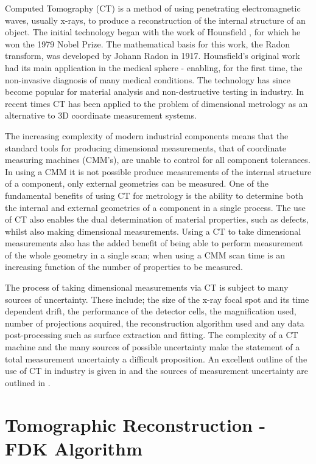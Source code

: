 \documentclass[
  twoside,
  11pt, a4paper,
  footinclude=true,
  headinclude=true,
  cleardoublepage=empty
]{scrbook}
\begin{document}
Computed Tomography (CT) is a method of using penetrating electromagnetic waves, usually x-rays, to produce a reconstruction of the internal structure of an object. The initial technology began with the work of Hounsfield \cite{hounsfield1973computerized}, for which he won the 1979 Nobel Prize. The mathematical basis for this work, the Radon transform, was developed by Johann Radon \cite{Radon1986} in 1917. Hounsfield’s original work had its main application in the medical sphere - enabling, for the first time, the non-invasive diagnosis of many medical conditions. The technology has since become popular for material analysis and non-destructive testing in industry. In recent times CT has been applied to the problem of dimensional metrology as an alternative to 3D coordinate measurement systems.

The increasing complexity of modern industrial components means that the standard tools for producing dimensional measurements, that of coordinate measuring machines (CMM’s), are unable to control for all component tolerances. In using a CMM it is not possible produce measurements of the internal structure of a component, only external geometries can be measured. One of the fundamental benefits of using CT for metrology is the ability to determine both the internal and external geometries of a component in a single process. The use of CT also enables the dual determination of material properties, such as defects, whilst also making dimensional measurements. Using a CT to take dimensional measurements also has the added benefit of being able to perform measurement of the whole geometry in a single scan; when using a CMM scan time is an increasing function of the number of properties to be measured.

The process of taking dimensional measurements via CT is subject to many sources of uncertainty. These include; the size of the x-ray focal spot and its time dependent drift, the performance of the detector cells, the magnification used, number of projections acquired, the reconstruction algorithm used and any data post-processing such as surface extraction and fitting. The complexity of a CT machine and the many sources of possible uncertainty make the statement of a total measurement uncertainty a difficult proposition. An excellent outline of the use of CT in industry is given in \cite{DeChiffre2014} and the sources of measurement uncertainty are outlined in \cite{Fle2014}.

\section{Tomographic Reconstruction - FDK Algorithm}
\end{document}
